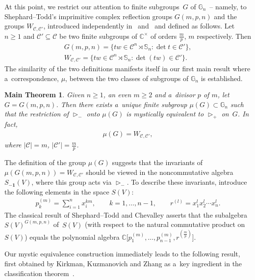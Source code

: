 \documentclass[11pt]{article}
\newtheorem{maintheorem}[Theorem]{Main Theorem}
\begin{document}
At this point, we restrict our attention to f\/inite subgroups~$G$ of $\mathbb G_n$~-- namely, to Shephard--Todd's
imprimitive complex ref\/lection groups $G(m,p,n)$ and the groups $W_{{\mathcal C},{\mathcal C}'}$, introduced
independently in~\cite{BBselecta} and~\cite{KKZ} and def\/ined as follows.
Let $n\ge 1$ and ${\mathcal C}'\subseteq{\mathcal C}$ be two f\/inite subgroups of $\mathbb C^\times$ of orders $\frac
mp$, $m$ respectively.
Then
\begin{gather*}
G(m,p,n)=\{tw\in {\mathcal C}^n\rtimes \mathbb S_n: \det t\in{\mathcal C}'\},
\\
W_{{\mathcal C},{\mathcal C}'} = \{ tw\in {\mathcal C}^n\rtimes \mathbb S_n: \det(tw)\in {\mathcal C}'\}.
\end{gather*}
The similarity of the two def\/initions manifests itself in our f\/irst main result  where a~correspondence, $\mu$,
between the two classes of subgroups of $\mathbb G_n$ is established.

\begin{maintheorem}
\label{thm:main}
Given $n\ge 1$, an even $m\ge 2$ and a~divisor $p$ of $m$, let $G=G(m,p,n)$.
Then there exists a~unique finite subgroup $ \mu(G) \subset \mathbb G_n $ such that the restriction of
$\mathop{\triangleright}\nolimits_-$ onto $\mu(G)$ is mystically equivalent to $\mathop{\triangleright}\nolimits_+$ on~$G$.
In fact,
\begin{gather*}
\mu(G)=W_{\mathcal C,\mathcal C'},
\end{gather*}
where $|{\mathcal C}|=m$, $|{\mathcal C}'|=\frac mp$.
\end{maintheorem}

The def\/inition of the group $\mu(G)$ suggests that the invariants of $\mu(G(m,p,n))=W_{{\mathcal C},{\mathcal C}'}$
should be viewed in the noncommutative algebra $S_{\mathbf{-1}}(V)$, where this group acts via
$\mathop{\triangleright}\nolimits_-$.
To describe these invariants, introduce the following elements in the space $S(V)$:
\begin{gather*}
p_k^{(m)} = \sum\limits_{i=1}^n x_i^{km},
\qquad
k=1,\ldots,n-1,
\qquad
r^{(l)} = x_1^{l}x_2^{l}\cdots x_n^{l}.
\end{gather*}
The classical result of Shephard--Todd and Chevalley asserts that the subalgebra $S(V)^{G(m,p,n)}$ of~$S(V)$ (with
respect to the natural commutative product on~$S(V)$) equals
the polynomial algebra $\mathbb C\big[p_1^{(m)},\ldots,p_{n-1}^{(m)}, r^{(\frac{m}{p})}\big]$.

Our mystic equivalence construction immediately leads to the following result, f\/irst obtained by Kirkman, Kuzmanovich
and Zhang as a~key ingredient in the classif\/ication theorem~\cite[Theorem~1.1]{KKZ}.
\end{document}
